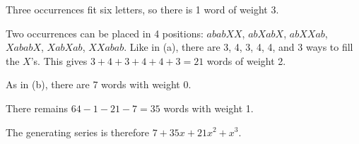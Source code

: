 \begin{enumerate}
\begin{sol}
          Three occurrences fit six letters, so there is 1 word of weight 3.

          Two occurrences can be placed in 4 positions:
          $ababXX$, $abXabX$, $abXXab$, $XababX$, $XabXab$, $XXabab$.
          Like in (a), there are 3, 4, 3, 4, 4, and 3 ways to fill the $X$'s.
          This gives $3 + 4 + 3 + 4 + 4 + 3 = 21$ words of weight 2.

          As in (b), there are 7 words with weight 0.

          There remains $64 - 1 - 21 - 7 = 35$ words with weight 1.

          The generating series is therefore $7 + 35x + 21x^2 + x^3$.
        \end{sol}
\end{enumerate}

\begin{xca}\label{xca:2-dice}\end{xca}

